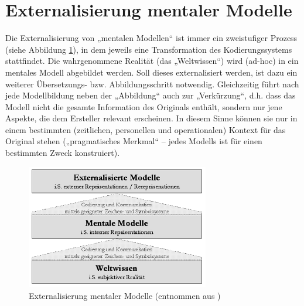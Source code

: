 \section{Externalisierung mentaler Modelle} %
\label{sec:externalisierung_mentaler_modelle}

Die Externalisierung von „mentalen Modellen“ ist immer ein zweistufiger Prozess (siehe Abbildung \ref{fig:img_MentaleModelle_iffenthaler_externalisierung}), in dem jeweils eine Transformation des Kodierungssystems stattfindet. Die wahrgenommene Realität (das „Weltwissen“) wird (ad-hoc) in ein mentales Modell abgebildet werden. Soll dieses externalisiert werden, ist dazu ein weiterer Übersetzungs- bzw. Abbildungsschritt notwendig. Gleichzeitig führt nach \citet{Stachowiak73} jede Modellbildung neben der „Abbildung“ auch zur „Verkürzung“, d.h. dass das Modell nicht die gesamte Information des Originals enthält, sondern nur jene Aspekte, die dem Ersteller relevant erscheinen. In diesem Sinne können sie nur in einem bestimmten (zeitlichen, personellen und operationalen) Kontext für das Original stehen („pragmatisches Merkmal“ -- jedes Modells ist für einen bestimmten Zweck konstruiert).

\begin{figure}[htbp]
	\centering
		\includegraphics[width=8cm]{img/MentaleModelle/iffenthaler_externalisierung.png}
	\caption[Externalisierung mentaler Modelle]{Externalisierung mentaler Modelle (entnommen aus \citep{Ifenthaler06})}
	\label{fig:img_MentaleModelle_iffenthaler_externalisierung}
\end{figure}

